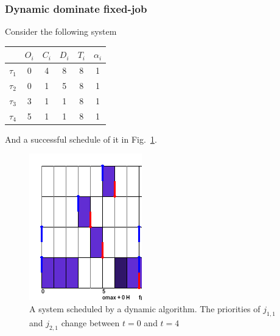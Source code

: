 \documentclass[a4paper,10pt]{article}
\begin{document}
        \subsubsection{Dynamic dominate fixed-job}

        Consider the following system

        \begin{center}
            \begin{tabular}{|r|c|c|c|c|c|}
                \hline
                            & $O_i$ & $C_i$ & $D_i$ & $T_i$ & $\alpha_i$ \\ \hline
                $\tau_1$    & 0     & 4     & 8    & 8     & 1     \\ \hline
                $\tau_2$    & 0     & 1     & 5    & 8     & 1     \\ \hline
                $\tau_3$    & 3     & 1     & 1    & 8     & 1     \\ \hline
                $\tau_4$    & 5     & 1     & 1    & 8     & 1     \\ \hline
            \end{tabular}
        \end{center}

        And a successful schedule of it in Fig.~\ref{fig:dponly_pallf}.

        \begin{figure}[H]
        \begin{center}
            \includegraphics[scale=0.7]{figs/dponly_palff.png}
            \caption{A system scheduled by a dynamic algorithm. The priorities of $j_{1,1}$ and $j_{2,1}$ change between $t=0$ and $t=4$}
            \label{fig:dponly_pallf}
        \end{center}
        \end{figure}
\end{document}
